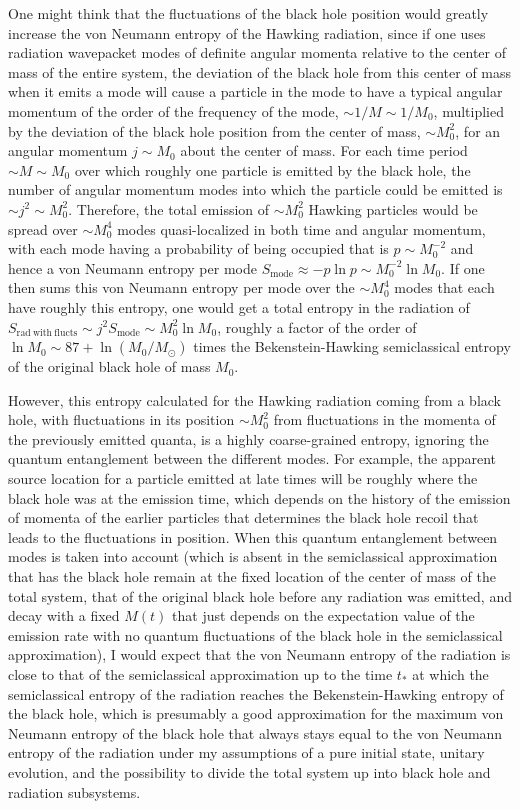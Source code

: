 \documentclass[12pt]{article}
\begin{document}
One might think that the fluctuations of the black hole position would greatly increase the von Neumann entropy of the Hawking radiation, since if one uses radiation wavepacket modes of definite angular momenta relative to the center of mass of the entire system, the deviation of the black hole from this center of mass when it emits a mode will cause a particle in the mode to have a typical angular momentum of the order of the frequency of the mode, $\sim 1/M \sim1/M_0$, multiplied by the deviation of the black hole position from the center of mass, $\sim M_0^2$, for an angular momentum $j\sim M_0$ about the center of mass.  For each time period $\sim M \sim M_0$ over which roughly one particle is emitted by the black hole, the number of angular momentum modes into which the particle could be emitted is $\sim j^2 \sim M_0^2$.  Therefore, the total emission of $\sim M_0^2$ Hawking particles would be spread over $\sim M_0^4$ modes quasi-localized in both time and angular momentum, with each mode having a probability of being occupied that is $p \sim M_0^{-2}$ and hence a von Neumann entropy per mode $S_\mathrm{mode} \approx -p\ln{p} \sim M_0^{-2} \ln{M_0}$.  If one then sums this von Neumann entropy per mode over the $\sim M_0^4$ modes that each have roughly this entropy, one would get a total entropy in the radiation of $S_\mathrm{rad\ with\ flucts} \sim j^2 S_\mathrm{mode} \sim M_0^2 \ln{M_0}$, roughly a factor of the order of $\ln{M_0} \sim 87 + \ln{(M_0/M_\odot)}$ times the Bekenstein-Hawking semiclassical entropy of the original black hole of mass $M_0$.

However, this entropy calculated for the Hawking radiation coming from a black hole, with fluctuations in its position $\sim M_0^2$ from fluctuations in the momenta of the previously emitted quanta, is a highly coarse-grained entropy, ignoring the quantum entanglement between the different modes.  For example, the apparent source location for a particle emitted at late times will be roughly where the black hole was at the emission time, which depends on the history of the emission of momenta of the earlier particles that determines the black hole recoil that leads to the fluctuations in position.  When this quantum entanglement between modes is taken into account (which is absent in the semiclassical approximation that has the black hole remain at the fixed location of the center of mass of the total system, that of the original black hole before any radiation was emitted, and decay with a fixed $M(t)$ that just depends on the expectation value of the emission rate with no quantum fluctuations of the black hole in the semiclassical approximation), I would expect that the von Neumann entropy of the radiation is close to that of the semiclassical approximation up to the time $t_\ast$ at which the semiclassical entropy of the radiation reaches the Bekenstein-Hawking entropy of the black hole, which is presumably a good approximation for the maximum von Neumann entropy of the black hole that always stays equal to the von Neumann entropy of the radiation under my assumptions of a pure initial state, unitary evolution, and the possibility to divide the total system up into black hole and radiation subsystems.
\end{document}
